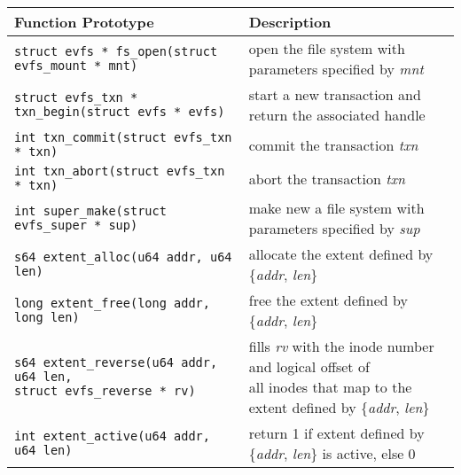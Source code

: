 \begin{table*}
\begin{center}
\begin{small}
\begin{tabular}[t]{|l|l|}
\hline 
\textbf{Function Prototype} & \textbf{Description} \\
\hline
\hline
\texttt{struct evfs * fs\_open(struct evfs\_mount * mnt)} & open the file system with parameters specified by \textit{mnt} \\
\hline
\hline
\texttt{struct evfs\_txn * txn\_begin(struct evfs * evfs)} & start a new transaction and return the associated handle \\
\hline 
\texttt{int txn\_commit(struct evfs\_txn * txn)} & commit the transaction \textit{txn} \\
\hline 
\texttt{int txn\_abort(struct evfs\_txn * txn)} & abort the transaction \textit{txn} \\
\hline
\hline
\texttt{int super\_make(struct evfs\_super * sup)} & make new a file system with parameters specified by \textit{sup} \\
\hline
\hline 
\texttt{s64 extent\_alloc(u64 addr, u64 len)} & allocate the extent defined by \{\textit{addr}, \textit{len}\} \\
\hline 
\texttt{long extent\_free(long addr, long len)} & free the extent defined by \{\textit{addr}, \textit{len}\} \\
\hline 
\makecell[l]{\texttt{s64 extent\_reverse(u64 addr, u64 len,} \\
\hspace{1em}\texttt{struct evfs\_reverse * rv)}} & \makecell[l]{fills \textit{rv} with the inode number and logical offset of \\ all inodes that map to the extent defined by \{\textit{addr}, \textit{len}\}} \\
\hline 
\texttt{int extent\_active(u64 addr, u64 len)} & return 1 if extent defined by \{\textit{addr}, \textit{len}\} is active, else 0 \\

\end{tabular}
\end{small}
\end{center}
\end{table*}
